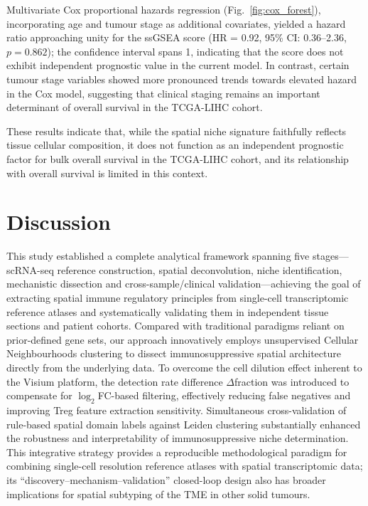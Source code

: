 \documentclass[12pt, a4paper]{article}
\begin{document}
Multivariate Cox proportional hazards regression (Fig.~\ref{fig:cox_forest}), incorporating age and tumour stage as additional covariates, yielded a hazard ratio approaching unity for the ssGSEA score (HR = 0.92, 95\% CI: 0.36--2.36, $p = 0.862$); the confidence interval spans 1, indicating that the score does not exhibit independent prognostic value in the current model. In contrast, certain tumour stage variables showed more pronounced trends towards elevated hazard in the Cox model, suggesting that clinical staging remains an important determinant of overall survival in the TCGA-LIHC cohort.

These results indicate that, while the spatial niche signature faithfully reflects tissue cellular composition, it does not function as an independent prognostic factor for bulk overall survival in the TCGA-LIHC cohort, and its relationship with overall survival is limited in this context.

\section{Discussion}

This study established a complete analytical framework spanning five stages---scRNA-seq reference construction, spatial deconvolution, niche identification, mechanistic dissection and cross-sample/clinical validation---achieving the goal of extracting spatial immune regulatory principles from single-cell transcriptomic reference atlases and systematically validating them in independent tissue sections and patient cohorts. Compared with traditional paradigms reliant on prior-defined gene sets, our approach innovatively employs unsupervised Cellular Neighbourhoods clustering to dissect immunosuppressive spatial architecture directly from the underlying data. To overcome the cell dilution effect inherent to the Visium platform, the detection rate difference $\Delta$fraction was introduced to compensate for $\log_2$FC-based filtering, effectively reducing false negatives and improving Treg feature extraction sensitivity. Simultaneous cross-validation of rule-based spatial domain labels against Leiden clustering substantially enhanced the robustness and interpretability of immunosuppressive niche determination. This integrative strategy provides a reproducible methodological paradigm for combining single-cell resolution reference atlases with spatial transcriptomic data; its ``discovery--mechanism--validation'' closed-loop design also has broader implications for spatial subtyping of the TME in other solid tumours.
\end{document}
